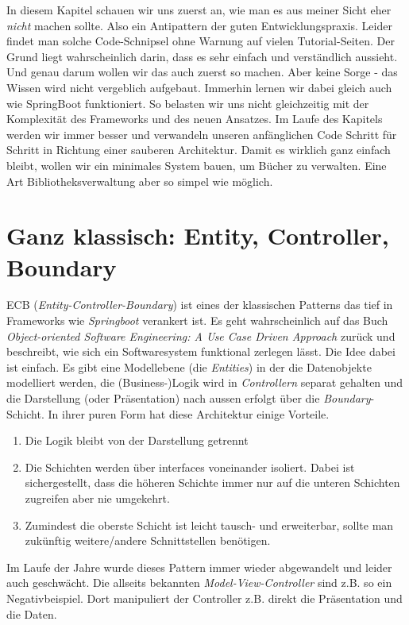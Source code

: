 In diesem Kapitel schauen wir uns zuerst an, wie man es aus meiner Sicht eher
\textit{nicht} machen
sollte. Also ein Antipattern der guten Entwicklungspraxis. Leider findet
man solche Code-Schnipsel ohne Warnung auf vielen Tutorial-Seiten. Der Grund
liegt wahrscheinlich darin, dass es sehr einfach und verständlich aussieht.
Und genau darum wollen wir das auch zuerst so machen. Aber keine Sorge - das
Wissen wird nicht vergeblich aufgebaut. Immerhin lernen wir dabei gleich auch
wie SpringBoot funktioniert. So belasten wir uns nicht gleichzeitig mit der
Komplexität des Frameworks und des neuen Ansatzes. Im Laufe des Kapitels
werden wir immer besser und verwandeln unseren anfänglichen Code Schritt für
Schritt in Richtung einer sauberen Architektur. Damit es wirklich ganz einfach
bleibt, wollen wir ein minimales System bauen, um Bücher zu verwalten. Eine
Art Bibliotheksverwaltung aber so simpel wie möglich.

\section{Ganz klassisch: Entity, Controller, Boundary}
ECB (\textit{Entity-Controller-Boundary}) ist eines der klassischen Patterns
das tief in Frameworks wie \textit{Springboot} verankert ist. Es geht 
wahrscheinlich auf das Buch \textit{Object-oriented Software Engineering: 
A Use Case Driven Approach} \cite{jacobson1993} zurück und beschreibt,
wie sich ein Softwaresystem funktional zerlegen lässt. Die Idee dabei
ist einfach. Es gibt eine Modellebene (die \textit{Entities}) in der 
die Datenobjekte modelliert werden, die (Business-)Logik wird in 
\textit{Controllern} separat gehalten und die Darstellung
(oder Präsentation) nach aussen erfolgt über die \textit{Boundary}-Schicht.
In ihrer puren Form hat diese Architektur einige Vorteile. 
\begin{enumerate}
    \item Die Logik bleibt von der Darstellung getrennt
    \item Die Schichten werden über interfaces voneinander
    isoliert. Dabei ist sichergestellt, dass die höheren
    Schichte immer nur auf die unteren Schichten zugreifen
    aber nie umgekehrt.
    \item Zumindest die oberste Schicht ist leicht tausch-
    und erweiterbar, sollte man zukünftig weitere/andere
    Schnittstellen benötigen.
\end{enumerate}

Im Laufe der Jahre wurde dieses Pattern immer wieder abgewandelt und
leider auch geschwächt. Die allseits bekannten \textit{Model-View-Controller}
sind z.B. so ein Negativbeispiel. Dort manipuliert der Controller z.B. direkt
die Präsentation und die Daten.

